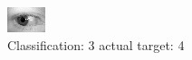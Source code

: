 \begin{figure}[h!]
\begin{center}
\includegraphics[width=0.60\columnwidth]{figures/ID753_class_3_target_4.png}
\end{center}
\caption{ Classification: 3 actual target: 4}
\label{fig:ID753_class_3_target_4}
\end{figure}
